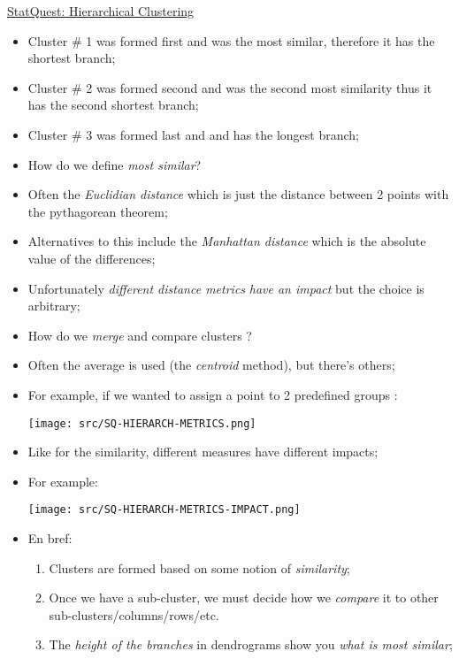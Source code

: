 \documentclass[12pt, titlepage, french]{report}
\begin{document}
\begin{YTB_SUMM}{\href{https://www.youtube.com/watch?v=7xHsRkOdVwo&list=PLblh5JKOoLUICTaGLRoHQDuF_7q2GfuJF&index=31}{StatQuest: Hierarchical Clustering}}
\begin{itemize}
	\texttt{[image: src/SQ-HIERARCH-heatmap-cluster-dendrogram.png]}
	\item[]	Cluster \# 1 was formed first and was the most similar, therefore it has the shortest branch;
	\item[]	Cluster \# 2 was formed second and was the second most similarity thus it has the second shortest branch;
	\item[]	Cluster \# 3 was formed last and and has the longest branch;
	\item	How do we define \textit{most similar}?
	\item[]	Often the \textit{Euclidian distance} which is just the distance between 2 points with the pythagorean theorem;
	\item[]	Alternatives to this include the \textit{Manhattan distance} which is the absolute value of the differences;
	\item[]	Unfortunately \textit{different distance metrics} \textit{have an impact} but the choice is arbitrary;
	\item	How do we \textit{merge} and compare clusters ?
	\item[]	Often the average is used (the \textit{centroid} method), but there's others;
	\item[]	For example, if we wanted to assign a point to 2 predefined groups :
	
	\texttt{[image: src/SQ-HIERARCH-METRICS.png]}
	\item[]	Like for the similarity, different measures have different impacts;
	\item[]	For example:
	
	\texttt{[image: src/SQ-HIERARCH-METRICS-IMPACT.png]}
	\item	En bref: 
		\begin{enumerate}
		\item	Clusters are formed based on some notion of \textit{similarity};
		\item	Once we have a sub-cluster, we must decide how we \textit{compare} it to other sub-clusters/columns/rows/etc.
		\item	The \textit{height of the branches} in dendrograms show you \textit{what is most similar};
		\end{enumerate}
\end{itemize}
\end{YTB_SUMM}
\end{document}
